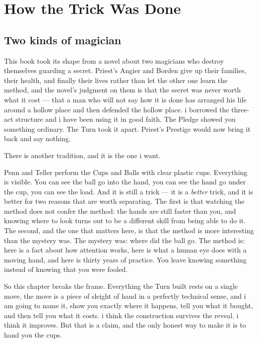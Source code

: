 \chapter{How the Trick Was Done}
\label{ch:trick}

\section{Two kinds of magician}
\label{sec:two-magicians}

This book took its shape from a novel about two magicians who
destroy themselves guarding a secret.
Priest's Angier and Borden give up their families, their health,
and finally their lives rather than let the other one learn the
method, and the novel's judgment on them is that the secret was
never worth what it cost --- that a man who will not say how it is
done has arranged his life around a hollow place and then defended
the hollow place.
i borrowed the three-act structure and i have been using it in good
faith.
The Pledge showed you something ordinary.
The Turn took it apart.
Priest's Prestige would now bring it back and say nothing.

There is another tradition, and it is the one i want.

Penn and Teller perform the Cups and Balls with clear plastic cups.
Everything is visible.
You can see the ball go into the hand, you can see the hand go
under the cup, you can see the load.
And it is still a trick --- it is a \emph{better} trick, and it is
better for two reasons that are worth separating.
The first is that watching the method does not confer the method:
the hands are still faster than you, and knowing where to look
turns out to be a different skill from being able to do it.
The second, and the one that matters here, is that the method is
more interesting than the mystery was.
The mystery was: where did the ball go.
The method is: here is a fact about how attention works, here is
what a human eye does with a moving hand, and here is thirty years
of practice.
You leave knowing something instead of knowing that you were
fooled.

So this chapter breaks the frame.
Everything the Turn built rests on a single move, the move is a
piece of sleight of hand in a perfectly technical sense, and i am
going to name it, show you exactly where it happens, tell you what
it bought, and then tell you what it costs.
i think the construction survives the reveal.
i think it improves.
But that is a claim, and the only honest way to make it is to hand
you the cups.

